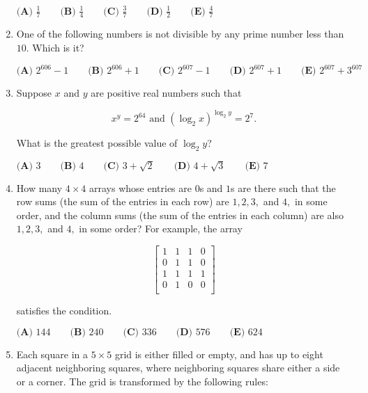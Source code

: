 \documentclass{article}
\begin{document}
\begin{enumerate}[label=\arabic*., itemsep=0.5em]
\(\textbf{(A) }\frac{1}{7} \qquad \textbf{(B) }\frac{1}{4} \qquad \textbf{(C) }\frac{3}{7} \qquad \textbf{(D) }\frac{1}{2} \qquad \textbf{(E) }\frac{4}{7}\)\par \vspace{0.5em}\item One of the following numbers is not divisible by any prime number less than \(10.\) Which is it?

\(\textbf{(A) } 2^{606}-1 \qquad\textbf{(B) } 2^{606}+1 \qquad\textbf{(C) } 2^{607}-1 \qquad\textbf{(D) } 2^{607}+1\qquad\textbf{(E) } 2^{607}+3^{607}\)\par \vspace{0.5em}\item Suppose \(x\) and \(y\) are positive real numbers such that

\begin{equation*}
x^y=2^{64}\text{ and }(\log_2{x})^{\log_2{y}}=2^{7}.
\end{equation*}

What is the greatest possible value of \(\log_2{y}\)?

\(\textbf{(A) }3 \qquad \textbf{(B) }4 \qquad \textbf{(C) }3+\sqrt{2} \qquad \textbf{(D) }4+\sqrt{3} \qquad \textbf{(E) }7\)\par \vspace{0.5em}\item How many \(4 \times 4\) arrays whose entries are \(0\)s and \(1\)s are there such that the row sums (the sum of the entries in each row) are \(1, 2, 3,\) and \(4,\) in some order, and the column sums (the sum of the entries in each column) are also \(1, 2, 3,\) and \(4,\) in some order? For example, the array

\begin{equation*}
\left[
  \begin{array}{cccc}
    1 & 1 & 1 & 0 \\
    0 & 1 & 1 & 0 \\
    1 & 1 & 1 & 1 \\
    0 & 1 & 0 & 0 \\
  \end{array}
\right]
\end{equation*}

satisfies the condition.

\(\textbf{(A) }144 \qquad \textbf{(B) }240 \qquad \textbf{(C) }336 \qquad \textbf{(D) }576 \qquad \textbf{(E) }624\)\par \vspace{0.5em}\item Each square in a \(5 \times 5\) grid is either filled or empty, and has up to eight adjacent neighboring squares, where neighboring squares share either a side or a corner. The grid is transformed by the following rules:


\end{enumerate}
\end{document}
